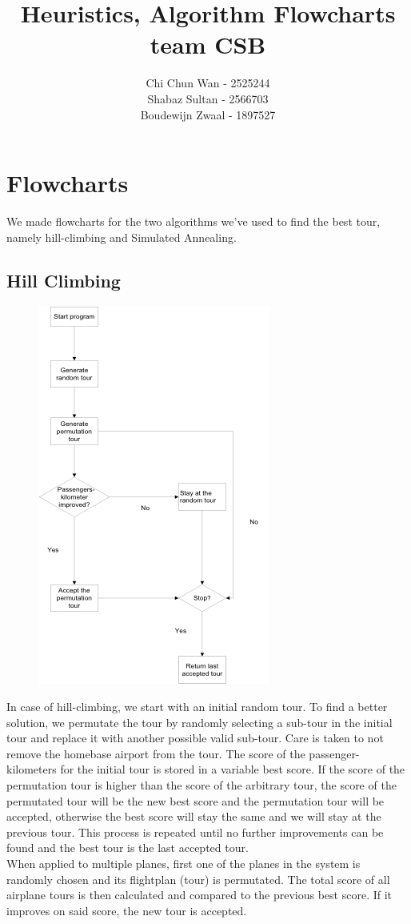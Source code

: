 \documentclass[a4paper]{article}
\author{Chi Chun Wan - 2525244\\
Shabaz Sultan - 2566703\\
Boudewijn Zwaal - 1897527}
\title{Heuristics, Algorithm Flowcharts team CSB}
\begin{document}
\maketitle
\section{Flowcharts}
We made flowcharts for the two algorithms we've used to find the best tour, namely hill-climbing and Simulated Annealing.
\subsection{Hill Climbing}
\begin{figure}[H]
    \includegraphics[scale=0.7]{hillclimb_chart.png}
\end{figure}
In case of hill-climbing, we start with an initial random tour. To find a better solution, we permutate the tour by randomly selecting a sub-tour in the initial tour and replace it with another possible valid sub-tour. Care is taken to not remove the homebase airport from the tour. The score of the passenger-kilometers for the initial tour is stored in a variable best score. If the score of the permutation tour is higher than the score of the arbitrary tour, the score of the permutated tour will be the new best score and the permutation tour will be accepted, otherwise the best score will stay the same and we will stay at the previous tour. This process is repeated until no further improvements can be found and the best tour is the last accepted tour. \\
When applied to multiple planes, first one of the planes in the system is randomly chosen and its flightplan (tour) is permutated. The total score of all airplane tours is then calculated and compared to the previous best score. If it improves on said score, the new tour is accepted.
\end{document}
